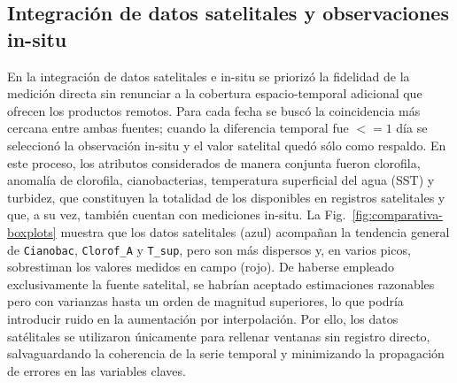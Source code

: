 \documentclass[
  11pt,
  pdftitle=TFI - Tschopp Joaquín S.,
  pdfauthor=Tschopp Joaquín S.,
  pdfcreator=LaTeX with hyperref,
]{report}  %
\begin{document}
\subsection{Integración de datos satelitales y observaciones in-situ}
En la integración de datos satelitales e in-situ se priorizó la fidelidad de la medición directa sin renunciar a la cobertura espacio-temporal adicional que ofrecen los productos remotos. Para cada fecha se buscó la coincidencia más cercana entre ambas fuentes; cuando la diferencia temporal fue $<=1$ día se seleccionó la observación in-situ y el valor satelital quedó sólo como respaldo. En este proceso, los atributos considerados de manera conjunta fueron clorofila, anomalía de clorofila, cianobacterias, temperatura superficial del agua (SST) y turbidez, que constituyen la totalidad de los disponibles en registros satelitales y que, a su vez, también cuentan con mediciones in-situ. La Fig.~\ref{fig:comparativa-boxplots} muestra que los datos satelitales (azul) acompañan la tendencia general de \texttt{Cianobac}, \texttt{Clorof\_A} y \texttt{T\_sup}, pero son más dispersos y, en varios picos, sobrestiman los valores medidos en campo (rojo). De haberse empleado exclusivamente la fuente satelital, se habrían aceptado estimaciones razonables pero con varianzas hasta un orden de magnitud superiores, lo que podría introducir ruido en la aumentación por interpolación. Por ello, los datos satélitales se utilizaron únicamente para rellenar ventanas sin registro directo, salvaguardando la coherencia de la serie temporal y minimizando la propagación de errores en las variables claves.
\end{document}
